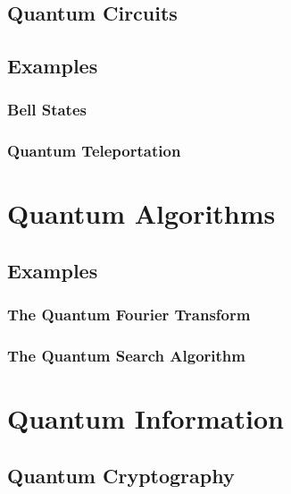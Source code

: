 \documentclass{article}
\begin{document}
    \subsection{Quantum Circuits}

    \subsection{Examples}

        \subsubsection{Bell States}

        \subsubsection{Quantum Teleportation}

\section{Quantum Algorithms}

    \subsection{Examples}

        \subsubsection{The Quantum Fourier Transform}

        \subsubsection{The Quantum Search Algorithm}

\section{Quantum Information}

    \subsection{Quantum Cryptography}

\newpage
\nocite{*}
\printbibliography
\end{document}
